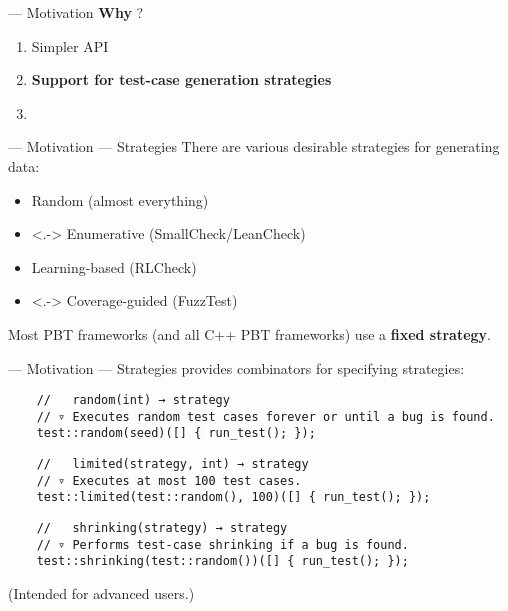 \begin{frame}{\halcheck{} --- Motivation}
  \textbf{Why} \halcheck{}?

  \begin{enumerate}
    \item Simpler API
    \item \textbf{Support for test-case generation strategies}
    \item
  \end{enumerate}
\end{frame}

\begin{frame}{\halcheck{} --- Motivation --- Strategies}
  There are various desirable strategies for generating data:
  \begin{itemize}
    \item<+-> Random (almost everything)
    \item<.-> Enumerative (SmallCheck/LeanCheck)
    \item<+-> Learning-based (RLCheck)
    \item<.-> Coverage-guided (FuzzTest)
  \end{itemize}

  Most PBT frameworks (and all C++ PBT frameworks) use a \textbf{fixed strategy}.
\end{frame}

\begin{frame}[fragile]{\halcheck{} --- Motivation --- Strategies}
  \halcheck{} provides combinators for specifying strategies:

  \begin{verbatim}
    //   random(int) → strategy
    // ▿ Executes random test cases forever or until a bug is found.
    test::random(seed)([] { run_test(); });
  \end{verbatim}

  \pause{}

  \begin{verbatim}
    //   limited(strategy, int) → strategy
    // ▿ Executes at most 100 test cases.
    test::limited(test::random(), 100)([] { run_test(); });
  \end{verbatim}

  \pause{}

  \begin{verbatim}
    //   shrinking(strategy) → strategy
    // ▿ Performs test-case shrinking if a bug is found.
    test::shrinking(test::random())([] { run_test(); });
  \end{verbatim}

  \pause{}

  (Intended for advanced users.)
\end{frame}

